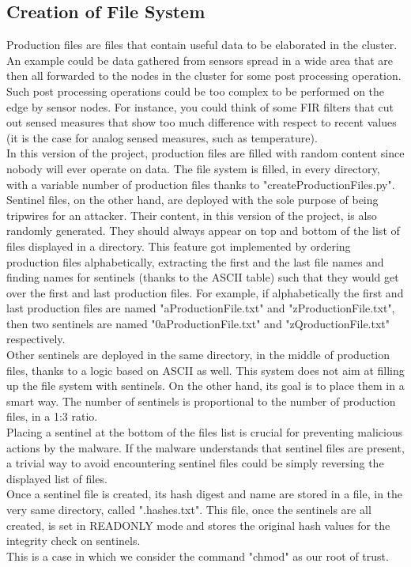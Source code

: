 \subsection{Creation of File System}

Production files are files that contain useful data to be elaborated in the cluster. An example could be data gathered from sensors spread in a wide area that are then all forwarded to the nodes in the cluster for some post processing operation. Such post processing operations could be too complex to be performed on the edge by sensor nodes. For instance, you could think of some FIR filters that cut out sensed measures that show too much difference with respect to recent values (it is the case for analog sensed measures, such as temperature).\\
In this version of the project, production files are filled with random content since nobody will ever operate on data. The file system is filled, in every directory, with a variable number of production files thanks to "createProductionFiles.py".\\
Sentinel files, on the other hand, are deployed with the sole purpose of being tripwires for an attacker. Their content, in this version of the project, is also randomly generated. They should always appear on top and bottom of the list of files displayed in a directory. This feature got implemented by ordering production files alphabetically, extracting the first and the last file names and finding names for sentinels (thanks to the ASCII table) such that they would get over the first and last production files. For example, if alphabetically the first and last production files are named "aProductionFile.txt" and "zProductionFile.txt", then two sentinels are named "0aProductionFile.txt" and "zQroductionFile.txt" respectively.\\
Other sentinels are deployed in the same directory, in the middle of production files, thanks to a logic based on ASCII as well. This system does not aim at filling up the file system with sentinels. On the other hand, its goal is to place them in a smart way. The number of sentinels is proportional to the number of production files, in a 1:3 ratio.\\
Placing a sentinel at the bottom of the files list is crucial for preventing malicious actions by the malware. If the malware understands that sentinel files are present, a trivial way to avoid encountering sentinel files could be simply reversing the displayed list of files.\\
Once a sentinel file is created, its hash digest and name are stored in a file, in the very same directory, called ".hashes.txt". This file, once the sentinels are all created, is set in READONLY mode and stores the original hash values for the integrity check on sentinels.\\
This is a case in which we consider the command "chmod" as our root of trust.\\


